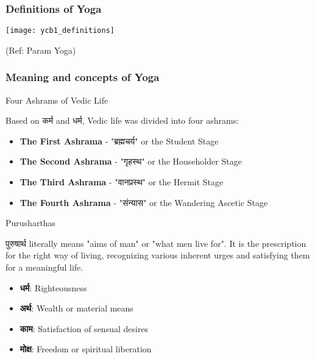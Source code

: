 \begin{frame}[fragile]\frametitle{Definitions of Yoga}
      \begin{center}
        \texttt{[image: ycb1\_definitions]}

		{\tiny (Ref: Param Yoga)}		
        \end{center}

\end{frame}

\begin{frame}[fragile]\frametitle{Meaning and concepts of Yoga}
Four Ashrams of Vedic Life

Based on कर्म and धर्म, Vedic life was divided into four ashrams: 

          \begin{itemize}
            \item \textbf{The First Ashrama} - "ब्रह्मचर्य" or the Student Stage
            \item \textbf{The Second Ashrama} - "गृहस्थ" or the Householder Stage
            \item \textbf{The Third Ashrama} - "वानप्रस्थ" or the Hermit Stage
            \item \textbf{The Fourth Ashrama} - "संन्यास" or the Wandering Ascetic Stage
          \end{itemize}
		  
Purusharthas
          
          पुरुषार्थ literally means "aims of man" or "what men live for". It is the prescription for the right way of living, recognizing various inherent urges and satisfying them for a meaningful life.
          
          \begin{itemize}
            \item \textbf{धर्म}: Righteousness
            \item \textbf{अर्थ}: Wealth or material means
            \item \textbf{काम}: Satisfaction of sensual desires
            \item \textbf{मोक्ष}: Freedom or spiritual liberation
          \end{itemize}
\end{frame}

